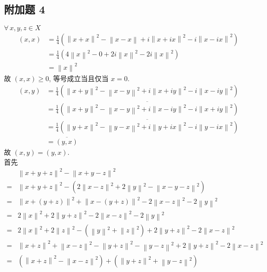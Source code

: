\documentclass[\ROOT/main.tex]{subfiles}
\begin{document}
\subsection{附加题 4}
$\forall \, x, y, z \in X$
\begin{align*}
    \left( x, x \right)
    &= \frac{1}{4} \left( \left\| x + x \right\|^2 - \left\| x - x \right\| + i \left\| x + i x \right\|^2 - i \left\| x - i x \right\|^2 \right) \\
    &= \frac{1}{4} \left( 4 \left\| x \right\|^2 - 0 + 2 i \left\| x \right\|^2 - 2 i \left\| x \right\|^2 \right) \\
    &= \left\| x \right\|^2
\end{align*}
故 $\left( x, x \right) \geqslant 0$, 等号成立当且仅当 $x = 0$.
\begin{align*}
    \left( x, y \right)
    &= \frac{1}{4} \left( \left\| x + y \right\|^2 - \left\| x - y \right\|^2 + i \left\| x + i y \right\|^2 - i \left\| x - i y \right\|^2 \right) \\
    &= \overline{\frac{1}{4} \left( \left\| x + y \right\|^2 - \left\| x - y \right\|^2 + i \left\| x - i y \right\|^2 - i \left\| x + i y \right\|^2 \right)} \\
    &= \overline{\frac{1}{4} \left( \left\| y + x \right\|^2 - \left\| y - x \right\|^2 + i \left\| y + i x \right\|^2 - i \left\| y - i x \right\|^2 \right)} \\
    &= \overline{\left( y, x \right)}
\end{align*}
故 $\left( x, y \right) = \left( y, x \right)$. \\
首先
\begin{align*}
    & \left\| x + y + z \right\|^2 - \left\| x + y - z \right\|^2 \\
    =& \left\| x + y + z \right\|^2 - \left( 2 \left\| x - z \right\|^2 + 2 \left\| y \right\|^2 - \left\| x - y - z \right\|^2 \right) \\
    =& \left\| x + \left( y + z \right) \right\|^2 + \left\| x - \left( y + z \right) \right\|^2 - 2 \left\| x - z \right\|^2 - 2 \left\| y \right\|^2 \\
    =& 2 \left\| x \right\|^2 + 2 \left\| y + z \right\|^2 - 2 \left\| x - z \right\|^2 - 2 \left\| y \right\|^2 \\
    =& 2 \left\| x \right\|^2 + 2 \left\| z \right\|^2 - \left( \left\| y \right\|^2 + \left\| z \right\|^2 \right) + 2 \left\| y + z \right\|^2 - 2 \left\| x - z \right\|^2 \\
    =& \left\| x + z \right\|^2 + \left\| x - z \right\|^2 - \left\| y + z \right\|^2 - \left\| y - z \right\|^2 + 2 \left\| y + z \right\|^2 - 2 \left\| x - z \right\|^2 \\
    =& \left( \left\| x + z \right\|^2 - \left\| x - z \right\|^2 \right) + \left( \left\| y + z \right\|^2 + \left\| y - z \right\|^2 \right)
\end{align*}
\end{document}
